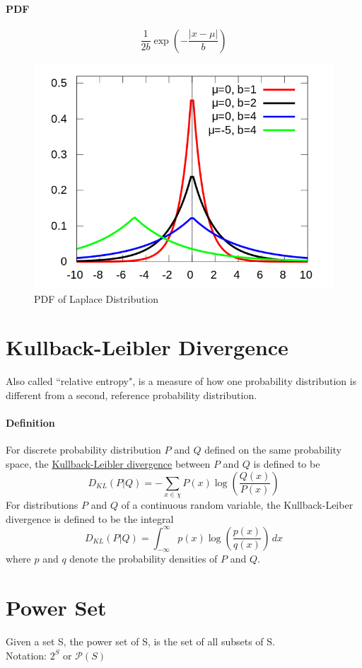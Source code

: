 \documentclass[11pt]{article}
\newcommand{\under}[1]{\underline{#1}}
\begin{document}
\paragraph{PDF}
$$\frac{1}{2b}\exp(-\frac{|x-\mu|}{b})$$
\begin{figure}[h]
	\centering
	\includegraphics[scale=0.3]{laplace.png}
	\caption{PDF of Laplace Distribution}
\end{figure}

\section{Kullback-Leibler Divergence}
Also called ``relative entropy", is a measure of how one probability distribution is different from a second, reference probability distribution.
\paragraph{Definition}
For discrete probability distribution $P$ and $Q$ defined on the same probability space, the \under{Kullback-Leibler divergence} between $P$ and $Q$ is defined to be
$$D_{KL}(P|Q) = - \sum_{x \in \chi} P(x)\log(\frac{Q(x)}{P(x)})$$
For distributions $P$ and $Q$ of a continuous random variable, the Kullback-Leiber divergence is defined to be the integral
$$D_{KL}(P|Q) = \int_{-\infty}^\infty p(x)\log(\frac{p(x)}{q(x)})\, dx$$ where $p$ and $q$ denote the probability densities of $P$ and $Q$.

\section{Power Set}
Given a set S, the power set of S, is the set of all subsets of S. \\
Notation: $2^S$ or $\mathcal{P}(S)$
\end{document}
